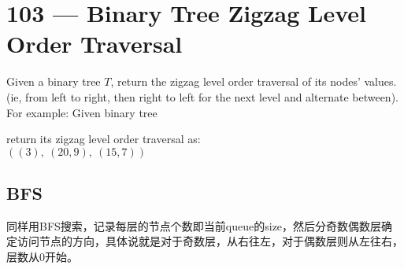 \section{103 --- Binary Tree Zigzag Level Order Traversal}
Given a binary tree $T$, return the zigzag level order traversal of its nodes' values. (ie, from left to right, then right to left for the next level and alternate between). For example: Given binary tree
\begin{figure}[H]
\end{figure}
return its zigzag level order traversal as:
\\
$\left((3),\ (20,9),\ (15,7)\right)$
\subsection{BFS}
同样用BFS搜索，记录每层的节点个数即当前queue的size，然后分奇数偶数层确定访问节点的方向，具体说就是对于奇数层，从右往左，对于偶数层则从左往右，层数从0开始。